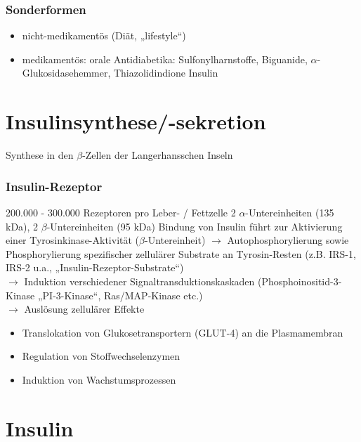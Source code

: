 \documentclass[10pt,a4paper]{report}
\begin{document}
\subsubsection{Sonderformen} %
\label{ssub:sonderformen}
\begin{itemize}
	\item nicht-medikamentös (Diät, „lifestyle“)
	\item medikamentös: 	orale Antidiabetika: Sulfonylharnstoffe, Biguanide, $\alpha$-Glukosidasehemmer, Thiazolidindione Insulin
\end{itemize}
\section{Insulinsynthese/-sekretion} %
\label{sec:insulinsynthese_sekretion}
Synthese in den $\beta$-Zellen der Langerhansschen Inseln
\subsubsection{Insulin-Rezeptor} %
\label{ssub:insulin_rezeptor}
200.000 - 300.000 Rezeptoren pro Leber- / Fettzelle
2 $\alpha$-Untereinheiten (135 kDa), 2 $\beta$-Untereinheiten (95 kDa)
Bindung von Insulin führt zur Aktivierung einer Tyrosinkinase-Aktivität ($\beta$-Untereinheit) $\rightarrow$ Autophosphorylierung sowie Phosphorylierung spezifischer zellulärer Substrate an Tyrosin-Resten (z.B. IRS-1, IRS-2 u.a., „Insulin-Rezeptor-Substrate“)\\
$\rightarrow$ 	Induktion verschiedener Signaltransduktionskaskaden (Phosphoinositid-3-Kinase „PI-3-Kinase“, Ras/MAP-Kinase etc.) \\
$\rightarrow$ 	Auslösung zellulärer Effekte
\begin{itemize}
	\item  Translokation von Glukosetransportern (GLUT-4) an die Plasmamembran 
	\item Regulation von Stoffwechselenzymen
	\item  Induktion von Wachstumsprozessen
\end{itemize}

\section{Insulin} %
\label{sec:insulin}
\end{document}

